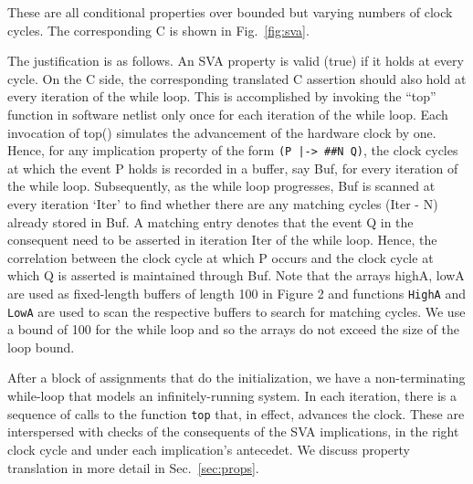 \noindent These are all conditional properties over bounded but varying numbers of clock cycles. The corresponding C is shown in Fig.~\ref{fig:sva}. 

The justification is as follows. An SVA property is valid (true) if it holds at every cycle. On the C side, the corresponding translated C assertion should also hold at every iteration of the while loop.  This is accomplished
by invoking the ``top'' function in software netlist only once for each iteration of the while loop. Each invocation of top() simulates the advancement of the hardware clock by one. Hence, for any implication property of the form \texttt{(P |-> \#\#N Q)}, the clock cycles at which the event P holds is recorded in a buffer, say Buf, for every iteration of the while loop.  Subsequently, as the while loop progresses, Buf is scanned at every iteration `Iter' to find whether there are any matching cycles (Iter - N) already stored in Buf. A matching entry denotes that the event Q in the consequent need to be asserted in iteration Iter of the while loop.  Hence, the correlation between the clock cycle at which P occurs and the clock cycle at which Q is asserted is maintained through Buf.  Note that the arrays highA, lowA are used as fixed-length buffers of length 100 in Figure 2 and functions \texttt{HighA} and \texttt{LowA} are used to scan the respective buffers to search for matching cycles. We use a bound of 100 for the while loop and so the arrays do not exceed the size of the loop bound.

After a block of assignments that do the initialization, we have a non-terminating while-loop that models an infinitely-running system. In each iteration, there is a sequence of calls to the function \texttt{top} that, in effect, advances the clock. These are interspersed with checks of the consequents of the SVA implications, in the right clock cycle and under each implication's antecedet. We discuss property translation in more detail in Sec.~\ref{sec:props}.

